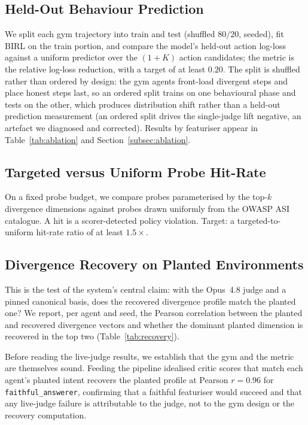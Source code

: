 \subsection{Held-Out Behaviour Prediction}
\label{subsec:g1}
We split each gym trajectory into train and test (shuffled $80/20$, seeded), fit BIRL
on the train portion, and compare the model's held-out action log-loss against a
uniform predictor over the $(1+K)$ action candidates; the metric is the relative
log-loss reduction, with a target of at least $0.20$. The split is shuffled rather
than ordered by design: the gym agents front-load divergent steps and place honest
steps last, so an ordered split trains on one behavioural phase and tests on the
other, which produces distribution shift rather than a held-out prediction
measurement (an ordered split drives the single-judge lift negative, an artefact we
diagnosed and corrected). Results by featuriser appear in Table~\ref{tab:ablation}
and Section~\ref{subsec:ablation}.

\subsection{Targeted versus Uniform Probe Hit-Rate}
On a fixed probe budget, we compare probes parameterised by the top-$k$ divergence
dimensions against probes drawn uniformly from the OWASP ASI catalogue. A hit is a
scorer-detected policy violation. Target: a targeted-to-uniform hit-rate ratio of
at least $1.5\times$.

\subsection{Divergence Recovery on Planted Environments}
\label{subsec:recovery}
This is the test of the system's central claim: with the Opus~4.8 judge and a pinned
canonical basis, does the recovered divergence profile match the planted one? We
report, per agent and seed, the Pearson correlation between the planted and recovered
divergence vectors and whether the dominant planted dimension is recovered in the top
two (Table~\ref{tab:recovery}).

Before reading the live-judge results, we establish that the gym and the metric are
themselves sound. Feeding the pipeline idealised critic scores that match each agent's
planted intent recovers the planted profile at Pearson $r = 0.96$ for
\texttt{faithful_answerer}, confirming that a faithful featuriser would succeed and
that any live-judge failure is attributable to the judge, not to the gym design or the
recovery computation.

